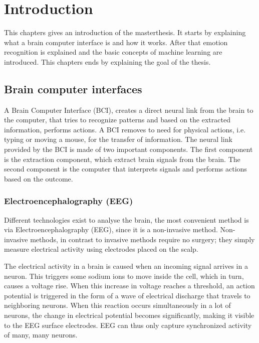 \chapter{Introduction}
{\samenvatting This chapters gives an introduction of the masterthesis. It starts by explaining what a brain computer interface is and how it works. After that emotion recognition is explained and the basic concepts of machine learning are introduced. This chapters ends by explaining the goal of the thesis.}


\section{Brain computer interfaces}

A Brain Computer Interface (BCI), creates a direct neural link from the brain to the computer\cite{LangModel}, that tries to recognize patterns and based on the extracted information, performs actions. A BCI removes to need for physical actions, i.e. typing or moving a mouse, for the transfer of information. The neural link provided by the BCI is made of two important components. The first component is the extraction component, which extract brain signals from the brain. The second component is the computer that interprets signals and performs actions based on the outcome.


\subsection{Electroencephalography (EEG)}
Different technologies exist to analyse the brain, the most convenient method is via Electroencephalography (EEG), since it is a non-invasive method. Non-invasive methods, in contrast to invasive methods require no surgery; they simply measure electrical activity using electrodes placed on the scalp.

\npar

The electrical activity in a brain is caused when an incoming signal arrives in a neuron. This triggers some sodium ions to move inside the cell, which in turn, causes a voltage rise\cite{ExtendedPaper}. When this increase in voltage reaches a threshold, an action potential is triggered in the form of a wave of electrical discharge that travels to neighboring neurons. When this reaction occurs simultaneously in a lot of neurons, the change in electrical potential becomes significantly, making it visible to the EEG surface electrodes. EEG can thus only capture synchronized activity of many, many neurons.

